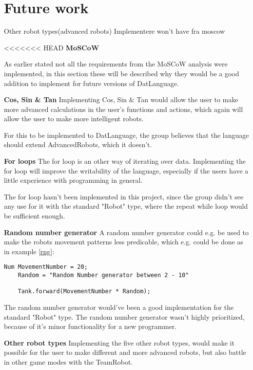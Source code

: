 \chapter{Future work}
Other robot types(advanced robots)
Implementere won't have fra moscow

<<<<<<< HEAD
\textbf{\LARGE{MoSCoW}}

As earlier stated not all the requirements from the MoSCoW analysis were implemented, in this section these will be described why they would be a good addition to implement for future versions of DatLanguage.

\textbf{Cos, Sin \& Tan}\newline
Implementing Cos, Sin \& Tan would allow the user to make more advanced calculations in the user's functions and actions, which again will allow the user to make more intelligent robots. 

For this to be implemented to DatLanguage, the group believes that the language should extend AdvancedRobots, which it doesn't. 

\textbf{For loops} \newline
The for loop is an other way of iterating over data. Implementing the for loop will improve the writability of the language, especially if the users have a little experience with programming in general.

The for loop hasn't been implemented in this project, since the group didn't see any use for it with the standard "Robot" type, where the repeat while loop would be sufficient enough. 

\textbf{Random number generator}\newline
A random number generator could e.g. be used to make  the robots movement patterns less predicable, which e.g. could be done as in example \ref{rng}: 

\begin{lstlisting}[caption={Simple example of a random number generator}, label={rng}]
	Num MovementNumber = 20;
	Random = "Random Number generator between 2 - 10"
	
	Tank.forward(MovementNumber * Random);
\end{lstlisting}

The random number generator would've been a good implementation for the standard "Robot" type. The random number generator wasn't highly prioritized, because of it's minor functionality for a new programmer.

\textbf{Other robot types}\newline
Implementing the five other robot types, would make it possible for the user to make different and more advanced robots, but also battle in other game modes with the TeamRobot.

